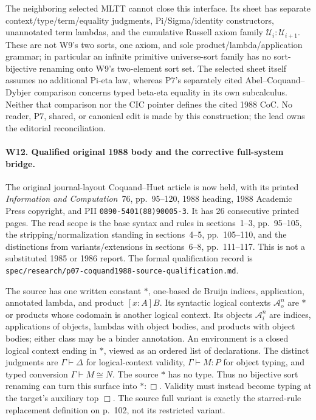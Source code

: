 The neighboring selected MLTT cannot close this interface. Its sheet
has separate context/type/term/equality judgments, Pi/Sigma/identity
constructors, unannotated term lambdas, and the cumulative Russell
axiom family \(\mathcal U_i:\mathcal U_{i+1}\). These are not W9's
two sorts, one axiom, and sole product/lambda/application grammar;
in particular an infinite primitive universe-sort family has no
sort-bijective renaming onto W9's two-element sort set. The selected
sheet itself assumes no additional Pi-eta law, whereas P7's separately
cited Abel--Coquand--Dybjer comparison concerns typed beta-eta equality
in its own subcalculus. Neither that comparison nor the CIC pointer
defines the cited 1988 CoC. No reader, P7, shared, or canonical edit is
made by this construction; the lead owns the editorial reconciliation.

\paragraph{W12. Qualified original 1988 body and the corrective full-system bridge.}
The original journal-layout Coquand--Huet article is now held, with its
printed \emph{Information and Computation}~76, pp.~95--120, 1988 heading,
1988 Academic Press copyright, and PII
\texttt{0890-5401(88)90005-3}. It has 26 consecutive printed pages.
The read scope is the base syntax and rules in sections~1--3, pp.~95--105,
the stripping/normalization standing in sections~4--5, pp.~105--110,
and the distinctions from variants/extensions in sections~6--8,
pp.~111--117. This is not a substituted 1985 or 1986 report.
The formal qualification record is
\texttt{spec/research/p07-coquand1988-source-qualification.md}.

The source has one written constant \(\ast\), one-based de Bruijn
indices, application, annotated lambda, and product \([x:A]B\).
Its syntactic logical contexts \(\mathcal A_o^n\) are \(\ast\)
or products whose codomain is another logical context. Its objects
\(\mathcal A_i^n\) are indices, applications of objects, lambdas with
object bodies, and products with object bodies; either class may be a
binder annotation. An environment is a closed logical context ending
in \(\ast\), viewed as an ordered list of declarations. The distinct
judgments are \(\Gamma\vdash\Delta\) for logical-context validity,
\(\Gamma\vdash M:P\) for object typing, and typed conversion
\(\Gamma\vdash M\cong N\). The source \(\ast\) has no type.
Thus no bijective sort renaming can turn this surface into
\(\ast:\Box\). Validity must instead become typing at the target's
auxiliary top \(\Box\). The source full variant is exactly the
starred-rule replacement definition on p.~102, not its restricted variant.

